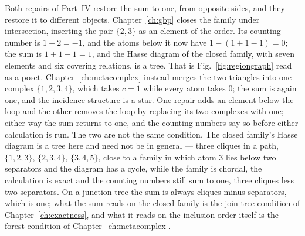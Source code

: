 Both repairs of Part~IV restore the sum to one, from opposite sides, and
they restore it to different objects.
Chapter~\ref{ch:gbp} closes the family under intersection, inserting the pair
$\{2,3\}$ as an element of the order. Its counting number is $1-2=-1$, and
the atoms below it now have $1-(1+1-1)=0$; the sum is $1+1-1=1$, and the
Hasse diagram of the closed family, with seven elements and six covering
relations, is a tree. That is Fig.~\ref{fig:regiongraph} read as a poset.
Chapter~\ref{ch:metacomplex} instead merges the two triangles into one
complex $\{1,2,3,4\}$, which takes $c=1$ while every atom takes $0$; the sum
is again one, and the incidence structure is a star. One repair adds an
element below the loop and the other removes the loop by replacing its two
complexes with one; either way the sum returns to one, and the counting
numbers say so before either calculation is run. The two are not the same
condition. The closed family's Hasse diagram is a tree here and need not be
in general --- three cliques in a path, $\{1,2,3\}$, $\{2,3,4\}$,
$\{3,4,5\}$, close to a family in which atom $3$ lies below two separators
and the diagram has a cycle, while the family is chordal, the calculation is
exact and the counting numbers still sum to one, three cliques less two
separators. On a junction tree the sum is always cliques minus separators,
which is one; what the sum reads on the closed family is the join-tree
condition of Chapter~\ref{ch:exactness}, and what it reads on the inclusion
order itself is the forest condition of Chapter~\ref{ch:metacomplex}.

